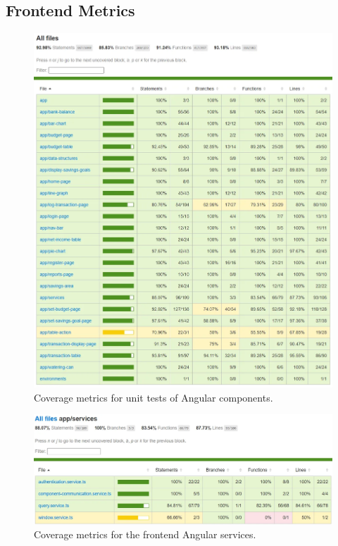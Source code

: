 \documentclass{l4proj}
\begin{document}
\begin{appendices}
\section{Frontend Metrics}
\label{app:code-coverage-frontend}
\begin{figure}[H]
    \centering
    \includegraphics[width=\linewidth]{images/Code-Coverage/coverage-frontend.png}
    \caption{Coverage metrics for unit tests of Angular components.}
    \label{fig:reports-page}
\end{figure}

\begin{figure}[H]
    \centering
    \includegraphics[width=\linewidth]{images/Code-Coverage/coverage-frontend-services.png}
    \caption{Coverage metrics for the frontend Angular services.}
    \label{fig:reports-page}
\end{figure}


\end{appendices}
\end{document}
